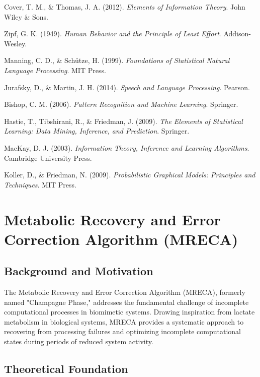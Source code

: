 \documentclass[12pt,a4paper]{article}
\begin{document}
\begin{thebibliography}{99}
Cover, T. M., \& Thomas, J. A. (2012). \textit{Elements of Information Theory}. John Wiley \& Sons.

Zipf, G. K. (1949). \textit{Human Behavior and the Principle of Least Effort}. Addison-Wesley.

Manning, C. D., \& Schütze, H. (1999). \textit{Foundations of Statistical Natural Language Processing}. MIT Press.

Jurafsky, D., \& Martin, J. H. (2014). \textit{Speech and Language Processing}. Pearson.

Bishop, C. M. (2006). \textit{Pattern Recognition and Machine Learning}. Springer.

Hastie, T., Tibshirani, R., \& Friedman, J. (2009). \textit{The Elements of Statistical Learning: Data Mining, Inference, and Prediction}. Springer.

MacKay, D. J. (2003). \textit{Information Theory, Inference and Learning Algorithms}. Cambridge University Press.

Koller, D., \& Friedman, N. (2009). \textit{Probabilistic Graphical Models: Principles and Techniques}. MIT Press.

\end{thebibliography}

\section{Metabolic Recovery and Error Correction Algorithm (MRECA)}

\subsection{Background and Motivation}

The Metabolic Recovery and Error Correction Algorithm (MRECA), formerly named "Champagne Phase," addresses the fundamental challenge of incomplete computational processes in biomimetic systems. Drawing inspiration from lactate metabolism in biological systems, MRECA provides a systematic approach to recovering from processing failures and optimizing incomplete computational states during periods of reduced system activity.

\subsection{Theoretical Foundation}
\end{document}
